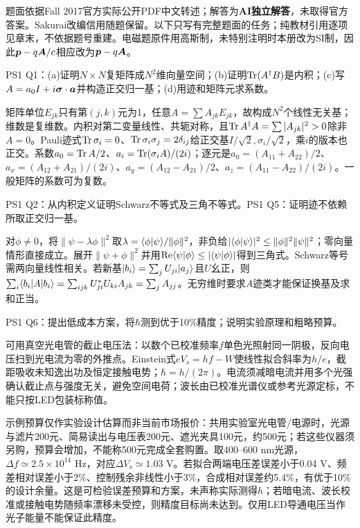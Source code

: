 题面依据Fall 2017官方实际公开PDF中文转述；解答为\textbf{AI独立解答}，未取得官方答案。Sakurai改编信用随题保留。以下只写有完整题面的任务；纯教材引用逐项见章末，不依据题号重建。电磁题原件用高斯制，未特别注明时本册改为SI制，因此$\boldsymbol{p}-q\boldsymbol{A}/c$相应改为$\boldsymbol{p}-q\boldsymbol{A}$。

\begin{exercise}
PS1 Q1：(a)证明$N\times N$复矩阵成$N^2$维向量空间；(b)证明$\operatorname{Tr}(A^\dagger B)$是内积；(c)写$A=a_0I+i\boldsymbol{\sigma}\cdot\boldsymbol{a}$并构造正交归一基；(d)用迹和矩阵元求系数。
\end{exercise}
\begin{solution}
矩阵单位$E_{jk}$只有第$(j,k)$元为1，任意$A=\sum A_{jk}E_{jk}$，故构成$N^2$个线性无关基；维数是复维数。内积对第二变量线性、共轭对称，且$\operatorname{Tr} A^\dagger A=\sum|A_{jk}|^2>0$除非$A=0$。Pauli迹式$\operatorname{Tr}\sigma_i=0$、$\operatorname{Tr}\sigma_i\sigma_j=2\delta_{ij}$给正交基$I/\sqrt2,\sigma_i/\sqrt2$，乘$i$的版本也正交。系数$a_0=\operatorname{Tr} A/2$、$a_i=\operatorname{Tr}(\sigma_iA)/(2i)$；逐元是$a_0=(A_{11}+A_{22})/2$、$a_x=(A_{12}+A_{21})/(2i)$、$a_y=(A_{12}-A_{21})/2$、$a_z=(A_{11}-A_{22})/(2i)$。一般矩阵的系数可为复数。
\end{solution}
\begin{exercise}
PS1 Q2：从内积定义证明Schwarz不等式及三角不等式。PS1 Q5：证明迹不依赖所取正交归一基。
\end{exercise}
\begin{solution}
对$\phi\ne0$，将$\|\psi-\lambda\phi\|^2$取$\lambda=\langle \phi\vert \psi\rangle/\|\phi\|^2$，非负给$|\langle \phi\vert \psi\rangle|^2\le\|\phi\|^2\|\psi\|^2$；零向量情形直接成立。展开$\|\psi+\phi\|^2$并用$\operatorname{Re}\langle \psi\vert \phi\rangle\le|\langle \psi\vert \phi\rangle|$得到三角式。Schwarz等号需两向量线性相关。若新基$\lvert b_i\rangle=\sum_jU_{ji}\lvert a_j\rangle$且$U$幺正，则$\sum_i\langle b_i\rvert A\lvert b_i\rangle=\sum_{ijk}U_{ji}^*U_{ki}A_{jk}=\sum_jA_{jj}$。无穷维时要求$A$迹类才能保证换基及求和正当。
\end{solution}
\begin{exercise}
PS1 Q6：提出低成本方案，将$\hbar$测到优于10\%精度；说明实验原理和粗略预算。
\end{exercise}
\begin{solution}
可用真空光电管的截止电压法：以数个已校准频率$f$单色光照射同一阴极，反向电压扫到光电流为零的外推点。Einstein式$eV_s=hf-W$使线性拟合斜率为$h/e$，截距吸收未知逸出功及恒定接触电势；$\hbar=h/(2\pi)$。电流须减暗电流并用多个光强确认截止点与强度无关，避免空间电荷；波长由已校准光谱仪或参考光源定标，不能只按LED包装标称值。

示例预算仅作实验设计估算而非当前市场报价：共用实验室光电管/电源时，光源与滤片200元、简易读出与电压表200元、遮光夹具100元，约500元；若这些仪器须另购，预算会增加，不能称500元完成全套购置。取400--600 nm光源，$\Delta f\simeq2.5\times10^{14}$ Hz，对应$\Delta V_s\simeq1.03$ V。若拟合两端电压差误差小于0.04 V、频差相对误差小于2\%、控制残余非线性小于3\%，合成相对误差约5.4\%，有优于10\%的设计余量。这是可检验误差预算和方案，未声称实际测得$h$；若暗电流、波长校准或接触电势随频率漂移未受控，则精度目标尚未达到。仅用LED导通电压当作光子能量不能保证此精度。
\end{solution}

